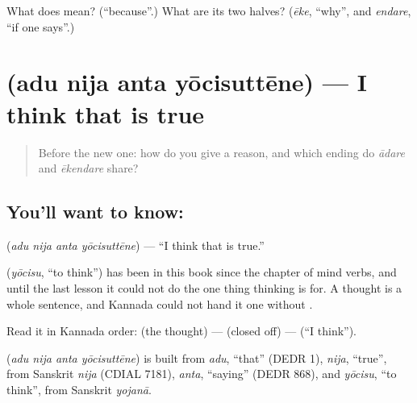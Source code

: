 \begin{tcolorbox}[breakable,colback=teal!4,colframe=teal!35!black,title={Before you move on}]
What does  mean? (\textquotedblleft{}because\textquotedblright{}.) What are its two halves? (\emph{ēke}, \textquotedblleft{}why\textquotedblright{}, and \emph{endare}, \textquotedblleft{}if one says\textquotedblright{}.)
\end{tcolorbox}
\section[\texorpdfstring{\kn{ಅದು} \kn{ನಿಜ} \kn{ಅಂತ} … (adu nija anta …)}{ಅದು ನಿಜ ಅಂತ … (adu nija anta …)}]{    (adu nija anta yōcisuttēne) — I think that is true}

\label{lesson:KA-C70-i-think}



\begin{quote}
Before the new one: how do you give a reason, and which ending do \emph{ādare} and \emph{ēkendare} share?
\end{quote}

\subsection*{You'll want to know:    }
\textbf{   } (\emph{adu nija anta yōcisuttēne}) — \textquotedblleft{}I think that is true.\textquotedblright{}

 (\emph{yōcisu}, \textquotedblleft{}to think\textquotedblright{}) has been in this book since the chapter of mind verbs, and until the last lesson it could not do the one thing thinking is for. A thought is a whole sentence, and Kannada could not hand it one without .

Read it in Kannada order: \textbf{ } (the thought) — \textbf{} (closed off) — \textbf{} (\textquotedblleft{}I think\textquotedblright{}).

\begin{cousinweb}
\textbf{   } (\emph{adu nija anta yōcisuttēne}) is built from \emph{adu}, \textquotedblleft{}that\textquotedblright{} (DEDR 1), \emph{nija}, \textquotedblleft{}true\textquotedblright{}, from Sanskrit \emph{nija} (CDIAL 7181), \emph{anta}, \textquotedblleft{}saying\textquotedblright{} (DEDR 868), and \emph{yōcisu}, \textquotedblleft{}to think\textquotedblright{}, from Sanskrit \emph{yojanā}.
\end{cousinweb}

